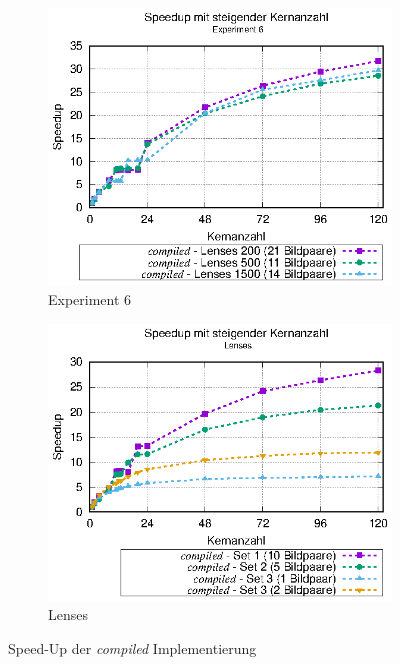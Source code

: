 \begin{center}
	\begin{figure}[h]
		\begin{subfigure}[b]{0.45\textwidth}
			\centering
			\includegraphics[width=\textwidth]{pdf/best_speedup_exp6_standalone}
			\caption{Experiment 6}
			\label{fig:best_speedup_exp6_standalone}
		\end{subfigure}
		\hfill
		\begin{subfigure}[b]{0.45\textwidth}
			\centering
			\includegraphics[width=\textwidth]{pdf/best_speedup_lenses_standalone}
			\caption{Lenses}
			\label{fig:best_speedup_lenses_standalone}
		\end{subfigure}
		\caption{Speed-Up der \textit{compiled} Implementierung}
		\label{fig:best_speedup_standalone}
	\end{figure}
\end{center}

